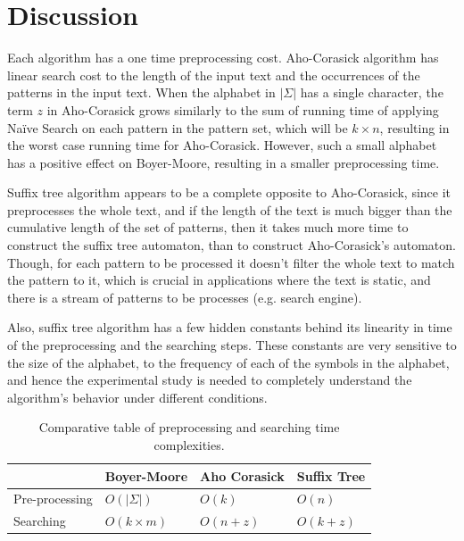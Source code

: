 \documentclass[paper=a4, fontsize=11pt]{scrartcl} %
\numberwithin{equation}{section} %
\numberwithin{figure}{section} %
\numberwithin{table}{section} %
\begin{document}
\section{Discussion}
\par Each algorithm has a one time preprocessing cost. Aho-Corasick algorithm has linear search cost to the length of the input text and the occurrences of the patterns in the input text. When the alphabet in $|\Sigma|$ has a single character, the term $z$ in Aho-Corasick grows similarly to the sum of running time of applying Na\"ive Search on each pattern in the pattern set, which will be $k\times n$, resulting in the worst case running time for Aho-Corasick. However, such a small alphabet has a positive effect on Boyer-Moore, resulting in a smaller preprocessing time.

\par Suffix tree algorithm appears to be a complete opposite to Aho-Corasick, since it preprocesses the whole text, and if the length of the text is much bigger than the cumulative length of the set of patterns, then it takes much more time to construct the suffix tree automaton, than to construct Aho-Corasick's automaton. Though, for each pattern to be processed it doesn't filter the whole text to match the pattern to it, which is crucial in applications where the text is static, and there is a stream of patterns to be processes (e.g. search engine).

\par Also, suffix tree algorithm has a few hidden constants behind its linearity in time of the preprocessing and the searching steps. These constants are very sensitive to the size of the alphabet, to the frequency of each of the symbols in the alphabet, and hence the experimental study is needed to completely understand the algorithm's behavior under different conditions.

\begin{table}[h!]
\centering
\begin{tabular}{| l | l | l | l |}
	\hline
	& Boyer-Moore & Aho Corasick & Suffix Tree \\
	\hline
	Pre-processing & $O(|\Sigma|)$ & $O(k)$ & $O(n)$ \\
	\hline
	Searching & $O(k\times m)$ & $O(n + z)$ & $O(k + z)$ \\
	\hline
\end{tabular}
\caption{Comparative table of preprocessing and searching time complexities.}
\end{table}


\newpage

\end{document}
